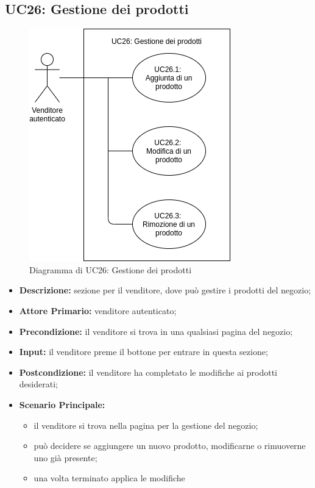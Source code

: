 \subsection{UC26: Gestione dei prodotti}
\label{sec:UC26}
\begin{figure}[!ht]
    \caption{Diagramma di UC26: Gestione dei prodotti}
    \vspace{10px}
    \includegraphics[scale=0.5]{../../../Images/AnalisiRequisiti/UC26}
    \centering
\end{figure}
\begin{itemize}
    \item \textbf{Descrizione:} sezione per il venditore, dove può gestire i prodotti del negozio;
    \item \textbf{Attore Primario:} venditore autenticato;
    \item \textbf{Precondizione:} il venditore si trova in una qualsiasi pagina del negozio;
    \item \textbf{Input:} il venditore preme il bottone per entrare in questa sezione;
    \item \textbf{Postcondizione:} il venditore ha completato le modifiche ai prodotti desiderati;
    \item \textbf{Scenario Principale:}
          \begin{itemize}
              \item il venditore si trova nella pagina per la gestione del negozio;
              \item può decidere se aggiungere un nuovo prodotto, modificarne o rimuoverne uno già presente;
              \item una volta terminato applica le modifiche
          \end{itemize}
\end{itemize}

